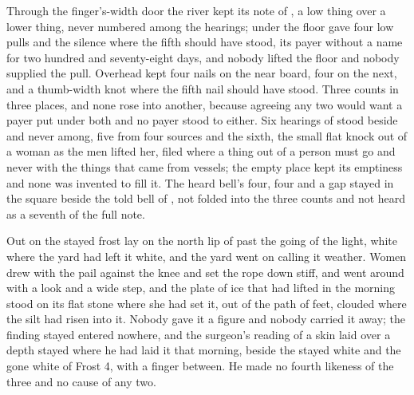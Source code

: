 Through the finger's-width door the river kept its note of , a low thing over a lower thing, never numbered among the hearings; under the floor  gave four low pulls and the silence where the fifth should have stood, its payer without a name for two hundred and seventy-eight days, and nobody lifted the floor and nobody supplied the pull. Overhead  kept four nails on the near board, four on the next, and a thumb-width knot where the fifth nail should have stood. Three counts in three places, and none rose into another, because agreeing any two would want a payer put under both and no payer stood to either. Six hearings of  stood beside and never among, five from four sources and the sixth, the small flat knock out of a woman as the men lifted her, filed where a thing out of a person must go and never with the things that came from vessels; the empty place kept its emptiness and none was invented to fill it. The heard bell's four, four and a gap stayed in the square beside the told bell of , not folded into the three counts and not heard as a seventh of the full note.

Out on  the stayed frost lay on the north lip of  past the going of the light, white where the yard had left it white, and the yard went on calling it weather. Women drew with the pail against the knee and set the rope down stiff, and went around  with a look and a wide step, and the plate of ice that  had lifted in the morning stood on its flat stone where she had set it, out of the path of feet, clouded where the silt had risen into it. Nobody gave it a figure and nobody carried it away; the finding stayed entered nowhere, and the surgeon's reading of a skin laid over a depth stayed where he had laid it that morning, beside the stayed white and the gone white of Frost 4, with a finger between. He made no fourth likeness of the three and no cause of any two.

